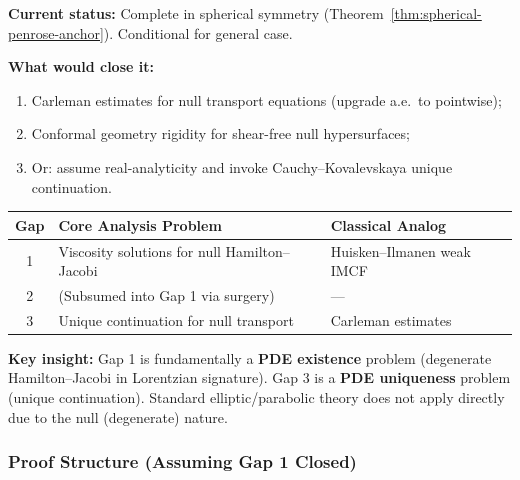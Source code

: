 \begin{remark}
\textbf{Current status:} Complete in spherical symmetry (Theorem~\ref{thm:spherical-penrose-anchor}). Conditional for general case.

\textbf{What would close it:}
\begin{enumerate}[label=(\alph*)]
\item Carleman estimates for null transport equations (upgrade a.e.\ to pointwise);
\item Conformal geometry rigidity for shear-free null hypersurfaces;
\item Or: assume real-analyticity and invoke Cauchy--Kovalevskaya unique continuation.
\end{enumerate}
\end{remark}

\begin{remark}
\begin{center}
\renewcommand{\arraystretch}{1.4}
\begin{tabular}{|c|l|l|}
\hline
\textbf{Gap} & \textbf{Core Analysis Problem} & \textbf{Classical Analog} \\
\hline
1 & Viscosity solutions for null Hamilton--Jacobi & Huisken--Ilmanen weak IMCF \\
2 & (Subsumed into Gap 1 via surgery) & --- \\
3 & Unique continuation for null transport & Carleman estimates \\
\hline
\end{tabular}
\end{center}

\textbf{Key insight:} Gap 1 is fundamentally a \textbf{PDE existence} problem (degenerate Hamilton--Jacobi in Lorentzian signature). Gap 3 is a \textbf{PDE uniqueness} problem (unique continuation). Standard elliptic/parabolic theory does not apply directly due to the null (degenerate) nature.
\end{remark}

\subsubsection{Proof Structure (Assuming Gap 1 Closed)}

